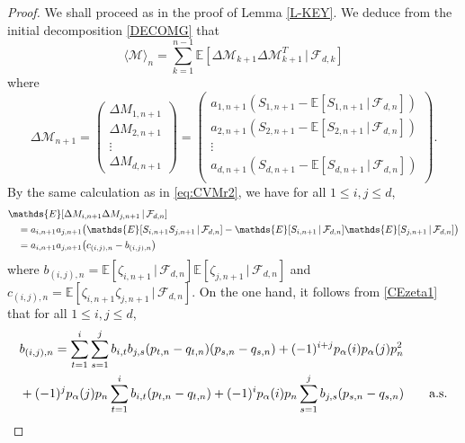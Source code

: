 \documentclass[twoside,12pt]{article}
\newcommand{\cM}{\mathcal{M}}
\newcommand{\E}{\mathds{E}}
\begin{document}
\begin{proof}
We shall proceed as in the proof of Lemma \ref{L-KEY}. We deduce from the initial decomposition \eqref{DECOMG} that 
\begin{equation}
\label{DEFmatrixIPMd}
\langle \cM\rangle_{n}=\sum_{k=1}^{n-1}\E[\Delta \cM_{k+1}\Delta \cM_{k+1}^{T}\,|\,\mathcal{F}_{d,k}]
\end{equation}
where
\begin{displaymath}
\Delta \cM_{n+1}=
\begin{pmatrix}
\Delta M_{1,n+1}\\
\Delta M_{2,n+1}\\
\vdots\\
\Delta M_{d,n+1}
\end{pmatrix}
=
\begin{pmatrix}
a_{1,n+1}(S_{1,n+1}-\E[S_{1,n+1}\,|\,\mathcal{F}_{d,n}])\\
a_{2,n+1}(S_{2,n+1}-\E[S_{2,n+1}\,|\,\mathcal{F}_{d,n}])\\
\vdots\\
a_{d,n+1}(S_{d,n+1}-\E[S_{d,n+1}\,|\,\mathcal{F}_{d,n}])\\
\end{pmatrix}.
\end{displaymath}
By the same calculation as in \eqref{eq:CVMr2}, we have for all $1\leq i,j \leq d$,
\begin{align}\label{eq:start}
& \E[\Delta M_{i,n+1}\Delta M_{j,n+1}\,|\,\mathcal{F}_{d,n}]\\
&\notag\quad=a_{i,n+1}a_{j,n+1}\big(\E[S_{i,n+1}S_{j,n+1}\,|\,\mathcal{F}_{d,n}]-\E[S_{i,n+1}\,|\,\mathcal{F}_{d,n}]\E[S_{j,n+1}\,|\,\mathcal{F}_{d,n}]\big) 
\\
&\notag\quad=a_{i,n+1}a_{j,n+1}\big(c_{(i,j),n}-b_{(i,j),n}\big)
\end{align}
where $b_{(i,j),n}=\E[\zeta_{i,n+1} \,|\,\mathcal{F}_{d,n}] \E[\zeta_{j,n+1} \,|\,\mathcal{F}_{d,n}]$ and
$c_{(i,j),n}=\E[\zeta_{i,n+1} \zeta_{j,n+1} \,|\,\mathcal{F}_{d,n}]$.
On the one hand, it follows from \eqref{CEzeta1} that for all $1\leq i,j \leq d$,
\begin{align}\label{equation_partb}
& b_{(i,j),n}= \sum_{t=1}^{i}\sum_{s=1}^{j}b_{i,t}b_{j,s}(p_{t,n}-q_{t,n})(p_{s,n}-q_{s,n})
+(-1)^{i+j}p_{\alpha}(i)p_{\alpha}(j)p_{n}^{2}\\
&\notag+(-1)^{j}p_{\alpha}(j)p_{n}\sum_{t=1}^{i}b_{i,t}(p_{t,n}-q_{t,n})+(-1)^{i}p_{\alpha}(i)p_{n}\sum_{s=1}^{j}b_{j,s}(p_{s,n}-q_{s,n}) \qquad \text{a.s.}
\end{align}

\end{proof}
\end{document}
